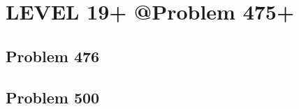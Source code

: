 \chapter{LEVEL 19+ @Problem 475+}
\section{Problem 476}
\begin{prob}
\end{prob}

\section{Problem 500}
\begin{prob}
\end{prob}